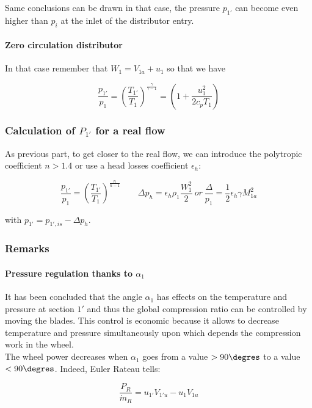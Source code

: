 Same conclusions can be drawn in that case, the pressure $p_{1'}$ can become even higher than $p_i$ at the inlet of the distributor entry. 

\paragraph{Zero circulation distributor}
In that case remember that $W_{1} = V_{1a} + u_1$ so that we have 

\begin{equation}
\frac{p_{1'}}{p_1} = \left(\frac{T_{1'}}{T_1} \right)^{\frac{\gamma}{\gamma -1}} = \left( 1 + \frac{u_1^2}{2c_pT_1} \right)
\end{equation}

\subsubsection{Calculation of $P_{1'}$ for a real flow}
As previous part, to get closer to the real flow, we can introduce the polytropic coefficient $n>1.4$ or use a head losses coefficient $\epsilon _h$: 

\begin{equation}
\frac{p_{1'}}{p_1} = \left(\frac{T_{1'}}{T_1} \right)^{\frac{n}{n -1}} \qquad \Delta p_h = \epsilon _h \rho _1 \frac{W_1^2}{2} \ or \ \frac{\Delta }{p_1} = \frac{1}{2}\epsilon _h\gamma M_{1a}^2 
\end{equation}

with $p_{1'}=  p_{1',is} - \Delta p_h$. 

\subsubsection{Remarks}
\paragraph{Pressure regulation thanks to $\alpha _1$}
It has been concluded that the angle $\alpha _1$ has effects on the temperature and pressure at section $1'$ and thus the global compression ratio can be controlled by moving the blades. This control is economic because it allows to decrease temperature and pressure simultaneously upon which depends the compression work in the wheel. \\

The wheel power decreases when $\alpha _1$ goes from a value $>90\degres$ to a value $<90\degres$. Indeed, Euler Rateau tells: 

\begin{equation}
\frac{P_R}{\dot{m}_R} = u_{1'}V_{1'u} - u_{1}V_{1u}
\end{equation}

